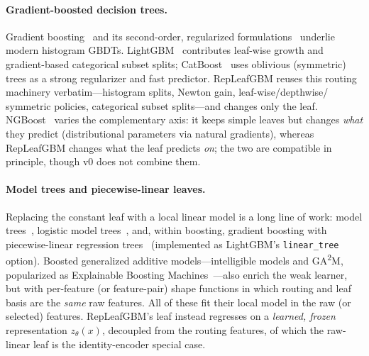 \documentclass[11pt]{article}
\newcommand{\zt}{z_{\theta}}
\begin{document}
\paragraph{Gradient-boosted decision trees.}
Gradient boosting~\citep{friedman2001greedy} and its second-order, regularized
formulations~\citep{friedman2000additive,chen2016xgboost} underlie modern histogram
GBDTs. LightGBM~\citep{ke2017lightgbm} contributes leaf-wise growth and gradient-based
categorical subset splits; CatBoost~\citep{prokhorenkova2018catboost} uses oblivious
(symmetric) trees as a strong regularizer and fast predictor. RepLeafGBM reuses this
routing machinery verbatim---histogram splits, Newton gain, leaf-wise/depthwise/
symmetric policies, categorical subset splits---and changes only the leaf.
NGBoost~\citep{duan2020ngboost} varies the complementary axis: it keeps simple leaves but
changes \emph{what} they predict (distributional parameters via natural gradients),
whereas RepLeafGBM changes what the leaf predicts \emph{on}; the two are compatible in
principle, though v0 does not combine them.

\paragraph{Model trees and piecewise-linear leaves.}
Replacing the constant leaf with a local linear model is a long line of work: model
trees~\citep{quinlan1992m5,wang1997m5prime}, logistic model
trees~\citep{landwehr2005lmt}, and, within boosting, gradient boosting with
piecewise-linear regression trees~\citep{shi2019gbdtpl} (implemented as LightGBM's
\texttt{linear\_tree} option). Boosted generalized additive models---intelligible
models and GA\textsuperscript{2}M, popularized as Explainable Boosting
Machines~\citep{lou2012intelligible,lou2013accurate}---also enrich the weak learner,
but with per-feature (or feature-pair) shape functions in which routing and leaf basis
are the \emph{same} raw features. All of these fit their local model in the raw (or
selected) features. RepLeafGBM's leaf instead regresses on a \emph{learned, frozen}
representation $\zt(x)$, decoupled from the routing features, of which the raw-linear
leaf is the identity-encoder special case.
\end{document}
